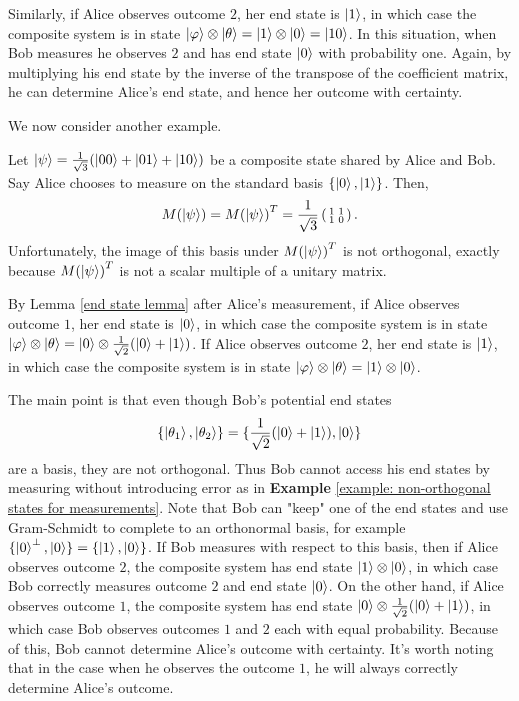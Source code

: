 \begin{example}
Similarly, if Alice observes outcome $2$, her end state is $\ket{1}$, in which case the composite system is in state $\ket{\varphi}\otimes\ket{\theta}=\ket{1}\otimes \ket{0}=\ket{10}$.  In this situation, when Bob measures he observes $2$ and has end state $\ket{0}$ with probability one.  Again, by multiplying his end state by the inverse of the transpose of the coefficient matrix, he can determine Alice's end state, and hence her outcome with certainty.
\end{example}




We now consider another example.




\begin{example}
\label{example bad}
Let $\ket{\psi}=\frac{1}{\sqrt{3}}(\ket{00}+\ket{01}+\ket{10})$ be a composite state shared by Alice and Bob. Say Alice chooses to measure on the standard basis $\{\ket{0}, \ket{1}\}$. Then,
\begin{equation*}
M(\ket{\psi})={M(\ket{\psi})}^T=\frac{1}{\sqrt{3}}\left(\begin{smallmatrix}1 & 1\\1 & 0\end{smallmatrix}\right).
\end{equation*}
 Unfortunately, the image of this basis under ${M(\ket{\psi})}^T$ is not orthogonal, exactly because ${M(\ket{\psi})}^T$ is not a scalar multiple of a unitary matrix.
 
 By Lemma \ref{end state lemma} after Alice's measurement, if Alice observes outcome $1$, her end state is $\ket{0}$, in which case the composite system is in state $\ket{\varphi}\otimes \ket{\theta}=\ket{0}\otimes\frac{1}{\sqrt{2}}(\ket{0}+\ket{1})$.  If Alice observes outcome $2$, her end state is $\ket{1}$, in which case the composite system is in state $\ket{\varphi}\otimes \ket{\theta}=\ket{1}\otimes \ket{0}$.
 
 The main point is that even though Bob's potential end states
 \begin{equation*}
 \{\ket{\theta_1},\ket{\theta_2}\}=\{\frac{1}{\sqrt{2}}(\ket{0}+\ket{1}),\ket{0} \}
 \end{equation*}
 are a basis, they are not orthogonal.  Thus Bob cannot access his end states by measuring without introducing error as in {\bf{Example}} \ref{example: non-orthogonal states for measurements}.  Note that Bob can "keep" one of the end states and use Gram-Schmidt to complete to an orthonormal basis, for example $\{\ket{0}^\perp, \ket{0}\}=\{\ket{1},\ket{0}\}$.  If Bob measures with respect to this basis, then if Alice observes outcome $2$, the composite system has end state $\ket{1}\otimes \ket{0}$, in which case Bob correctly measures outcome $2$ and end state $\ket{0}$.  On the other hand, if Alice observes outcome $1$, the composite system has end state $\ket{0}\otimes\frac{1}{\sqrt{2}}(\ket{0}+\ket{1})$, in which case Bob observes outcomes $1$ and $2$ each with equal probability.  Because of this, Bob cannot determine Alice's outcome with certainty.  It's worth noting that in the case when he observes the outcome $1$, he will always correctly determine Alice's outcome.


\end{example}
